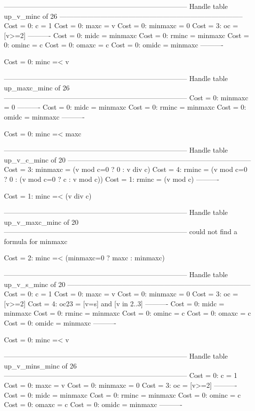 --------------------------------------------------------------------------------
Handle table up_v_minc of 26
--------------------------------------------------------------------------------
Cost =  0:  c       = 1
Cost =  0:  maxc    = v
Cost =  0:  minmaxc = 0
Cost =  3:  oc      = [v>=2]
----------
Cost =  0:  midc    = minmaxc
Cost =  0:  rminc   = minmaxc
Cost =  0:  ominc   = c
Cost =  0:  omaxc   = c
Cost =  0:  omidc   = minmaxc
----------

Cost =  0:  minc =< v

--------------------------------------------------------------------------------
Handle table up_maxc_minc of 26
--------------------------------------------------------------------------------
Cost =  0:  minmaxc = 0
----------
Cost =  0:  midc    = minmaxc
Cost =  0:  rminc   = minmaxc
Cost =  0:  omidc   = minmaxc
----------

Cost =  0:  minc =< maxc

--------------------------------------------------------------------------------
Handle table up_v_c_minc of 20
--------------------------------------------------------------------------------
Cost =  3:  minmaxc = (v mod c=0 ? 0 : v div c)
Cost =  4:  rminc   = (v mod c=0 ? 0 : (v mod c=0 ? c : v mod c))
Cost =  1:  rminc   = (v mod c)
----------

Cost =  1:  minc =< (v div c)

--------------------------------------------------------------------------------
Handle table up_v_maxc_minc of 20
--------------------------------------------------------------------------------
could not find a formula for minmaxc

Cost =  2:  minc =< (minmaxc=0 ? maxc : minmaxc)

--------------------------------------------------------------------------------
Handle table up_v_s_minc of 20
--------------------------------------------------------------------------------
Cost =  0:  c       = 1
Cost =  0:  maxc    = v
Cost =  0:  minmaxc = 0
Cost =  3:  oc      = [v>=2]
Cost =  4:  oc23    = [v=s] and [v in 2..3]
----------
Cost =  0:  midc    = minmaxc
Cost =  0:  rminc   = minmaxc
Cost =  0:  ominc   = c
Cost =  0:  omaxc   = c
Cost =  0:  omidc   = minmaxc
----------

Cost =  0:  minc =< v

--------------------------------------------------------------------------------
Handle table up_v_mins_minc of 26
--------------------------------------------------------------------------------
Cost =  0:  c       = 1
Cost =  0:  maxc    = v
Cost =  0:  minmaxc = 0
Cost =  3:  oc      = [v>=2]
----------
Cost =  0:  midc    = minmaxc
Cost =  0:  rminc   = minmaxc
Cost =  0:  ominc   = c
Cost =  0:  omaxc   = c
Cost =  0:  omidc   = minmaxc
----------

